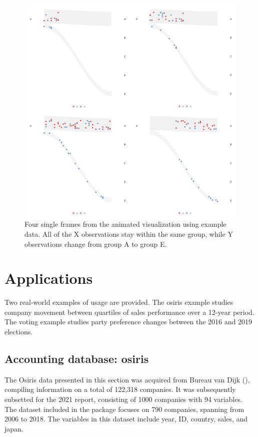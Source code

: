 \begin{figure}

{\centering \includegraphics[width=1\linewidth]{figures/animation-example} 

}

\caption{Four single frames from the animated visualization using example data. All of the X observations stay within the same group, while Y observations change from group A to group E.}\label{fig:catchange-figure}
\end{figure}

\section{Applications}\label{applications}

Two real-world examples of usage are provided. The osiris example studies company movement between quartiles of sales performance over a 12-year period. The voting example studies party preference changes between the 2016 and 2019 elections.

\subsection{Accounting database: osiris}\label{accounting-database-osiris}

The Osiris data presented in this section was acquired from Bureau van Dijk (\citet{bvd}), compiling information on a total of 122,318 companies. It was subsequently subsetted for the 2021 report, consisting of 1000 companies with 94 variables. The dataset included in the package focuses on 790 companies, spanning from 2006 to 2018. The variables in this dataset include year, ID, country, sales, and japan.

